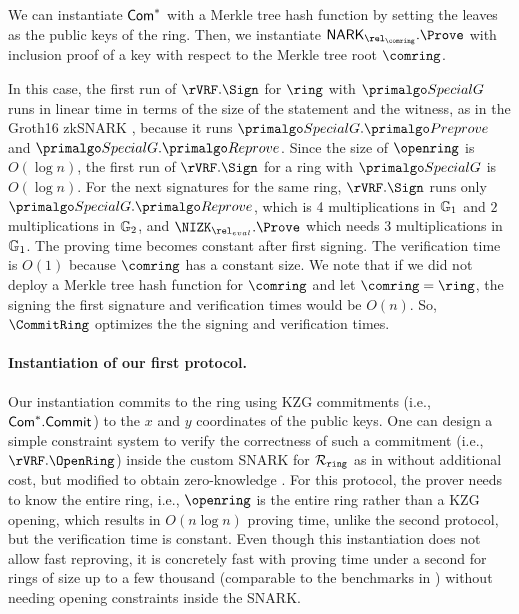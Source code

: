 We can instantiate $ \mathsf{Com}^*$ with a Merkle tree hash function by setting the leaves as the public keys of the ring. Then, we instantiate $ \NARK_{\relcomring}.\Prove $ with inclusion proof of a key with respect to the Merkle tree root $ \comring $.

In this case, the first run of $\rVRF.\Sign$ for $\ring$ with $ \SpecialG $ runs in linear time in terms of the size of the statement and the witness, as in the Groth16 zkSNARK \cite{Groth16}, because it runs $ \SpecialG.\Preprove $ and $ \SpecialG.\Reprove $. Since the size of $ \openring $ is
$ O(\log n) $, the first run of $\rVRF.\Sign$ for a ring with $ \SpecialG $ is $ O(\log n) $.
For the next signatures for the same ring,  $\rVRF.\Sign$  runs only  $\SpecialG.\Reprove$, which is 4 multiplications in $\mathbb{G}_1 $ and $2$ multiplications in $\mathbb{G}_2$, and  $\NIZK_{\rel_{eval}}.\Prove$ which needs  3 multiplications in $ \mathbb{G}_1 $.  The proving time becomes constant after first signing. 
The verification time is $ O(1) $ because $ \comring $ has a constant size.
We note that if we did not deploy a Merkle tree hash function for $ \comring $ and let $ \comring = \ring $, the signing the first signature and verification times would be $ O(n) $. So, $ \CommitRing $ optimizes the the signing and verification times.

\paragraph{Instantiation of our first protocol.}  Our instantiation commits to the ring using KZG commitments (i.e., $ \mathsf{Com}^*.\mathsf{Commit} $) to the $ x $ and $ y $ coordinates of the public keys.
One can design a simple constraint system to verify the correctness of such a commitment (i.e., $ \rVRF.\OpenRing $) inside the custom SNARK for $\mathcal{R}_{\mathtt{ring}}$ as in \cite{accountable} without additional cost, but  modified to obtain zero-knowledge \cite{plonk}.  For this protocol, the prover needs to know the entire ring, i.e., $\openring$ is the entire ring rather than a KZG opening, which results in $O(n \log n)$ proving time, unlike the second protocol, but the verification time is constant. Even though this instantiation  does not allow fast reproving,  it is concretely fast with proving time under a second for rings of size up to a few thousand (comparable to the benchmarks in \cite{accountable}) without needing opening constraints inside the SNARK. 

